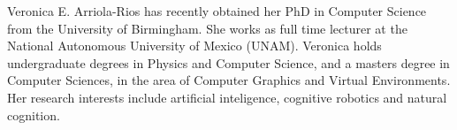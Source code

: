 \documentclass[journal]{IEEEtran}
\begin{document}

%



\balance
%
% 
% 

% 

\begin{IEEEbiography}{Veronica E. Arriola-Rios}
  has recently obtained her PhD in Computer Science from the University of Birmingham.
  She works as full time lecturer at the National Autonomous University of Mexico (UNAM).
  Veronica holds undergraduate degrees in Physics and Computer Science, and a masters degree in Computer Sciences, in the area of Computer Graphics and Virtual Environments.
  Her research interests include artificial inteligence, cognitive robotics and natural cognition.
\end{IEEEbiography}
\end{document}
